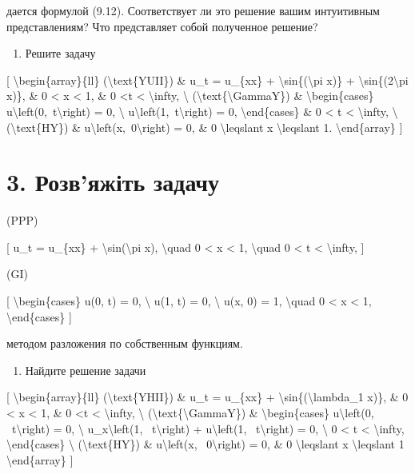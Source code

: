 \documentclass[
]{article}
\providecommand{\tightlist}{%
  \setlength{\itemsep}{0pt}\setlength{\parskip}{0pt}}
\begin{document}
дается формулой (9.12). Соответствует ли это решение вашим интуитивным
представлениям? Что представляет собой полученное решение?

\begin{enumerate}
\def\labelenumi{\arabic{enumi}.}
\setcounter{enumi}{1}
\tightlist
\item
  Решите задачу
\end{enumerate}

{[} \textbackslash begin\{array\}\{ll\} (\textbackslash text\{YUII\}) \&
u\_t = u\_\{xx\} + \textbackslash sin\{(\textbackslash pi x)\} +
\textbackslash sin\{(2\textbackslash pi x)\}, \& 0 \textless{} x
\textless{} 1, \& 0 \textless t \textless{} \textbackslash infty,
\textbackslash{} (\textbackslash text\{\textbackslash GammaY\}) \&
\textbackslash begin\{cases\}
u\textbackslash left(0,~t\textbackslash right) = 0, \textbackslash{}
u\textbackslash left(1,~t\textbackslash right) = 0,
\textbackslash end\{cases\} \& 0 \textless{} t \textless{}
\textbackslash infty, \textbackslash{} (\textbackslash text\{HY\}) \&
u\textbackslash left(x,~0\textbackslash right) = 0, \& 0
\textbackslash leqslant x \textbackslash leqslant 1.
\textbackslash end\{array\} {]}

\section{3. Розв'яжіть
задачу}\label{ux440ux43eux437ux432ux44fux436ux456ux442ux44c-ux437ux430ux434ux430ux447ux443}

(PPP)

{[} u\_t = u\_\{xx\} + \textbackslash sin(\textbackslash pi x),
\textbackslash quad 0 \textless{} x \textless{} 1, \textbackslash quad 0
\textless{} t \textless{} \textbackslash infty, {]}

(GI)

{[} \textbackslash begin\{cases\} u(0, t) = 0, \textbackslash{} u(1, t)
= 0, \textbackslash{} u(x, 0) = 1, \textbackslash quad 0 \textless{} x
\textless{} 1, \textbackslash end\{cases\} {]}

методом разложения по собственным функциям.

\begin{enumerate}
\def\labelenumi{\arabic{enumi}.}
\setcounter{enumi}{3}
\tightlist
\item
  Найдите решение задачи
\end{enumerate}

{[} \textbackslash begin\{array\}\{ll\} (\textbackslash text\{YHII\}) \&
u\_t = u\_\{xx\} + \textbackslash sin\{(\textbackslash lambda\_1 x)\},
\& 0 \textless{} x \textless{} 1, \& 0 \textless t \textless{}
\textbackslash infty, \textbackslash{}
(\textbackslash text\{\textbackslash GammaY\}) \&
\textbackslash begin\{cases\} u\textbackslash left(0,
~t\textbackslash right) = 0, \textbackslash{} u\_x\textbackslash left(1,
~t\textbackslash right) + u\textbackslash left(1,
~t\textbackslash right) = 0, \textbackslash{} 0 \textless{} t
\textless{} \textbackslash infty, \textbackslash end\{cases\}
\textbackslash{} (\textbackslash text\{HY\}) \& u\textbackslash left(x,
~0\textbackslash right) = 0, \& 0 \textbackslash leqslant x
\textbackslash leqslant 1 \textbackslash end\{array\} {]}
\end{document}
